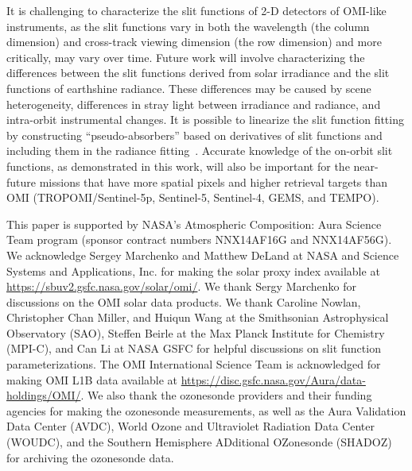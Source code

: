 \documentclass[amt,manuscript]{copernicus}
\begin{document}
It is challenging to characterize the slit functions of 2-D detectors of OMI-like instruments, as the slit functions vary in both the wavelength (the column dimension) and cross-track viewing dimension (the row dimension) and more critically, may vary over time. Future work will involve characterizing the differences between the slit functions derived from solar irradiance and the slit functions of earthshine radiance. These differences may be caused by scene heterogeneity, differences in stray light between irradiance and radiance, and intra-orbit instrumental changes. It is possible to linearize the slit function fitting by constructing ``pseudo-absorbers'' based on derivatives of slit functions and including them in the radiance fitting~\citep{Beirle2016parameterizing}. Accurate knowledge of the on-orbit slit functions, as demonstrated in this work, will also be important for the near-future missions that have more spatial pixels and higher retrieval targets than OMI (TROPOMI/Sentinel-5p, Sentinel-5, Sentinel-4, GEMS, and TEMPO). %





\begin{acknowledgements}
This paper is supported by NASA’s Atmospheric Composition: Aura Science Team program (sponsor contract numbers NNX14AF16G and NNX14AF56G). We acknowledge Sergey Marchenko and Matthew DeLand at NASA and Science Systems and Applications, Inc. for making the solar proxy index available at \url{https://sbuv2.gsfc.nasa.gov/solar/omi/}. We thank Sergy Marchenko for discussions on the OMI solar data products. We thank Caroline Nowlan, Christopher Chan Miller, and Huiqun Wang at the Smithsonian Astrophysical Observatory (SAO), Steffen Beirle at the Max Planck Institute for Chemistry (MPI-C), and Can Li at NASA GSFC for helpful discussions on slit function parameterizations. The OMI International Science Team is acknowledged for making OMI L1B data available at
\url{https://disc.gsfc.nasa.gov/Aura/data-holdings/OMI/}. We also thank the ozonesonde  providers and their funding agencies for making the ozonesonde measurements, as well as the Aura Validation Data Center (AVDC), World Ozone and Ultraviolet Radiation Data Center (WOUDC), and the Southern Hemisphere ADditional OZonesonde (SHADOZ) for archiving the ozonesonde data.
\end{acknowledgements}




\end{document}
